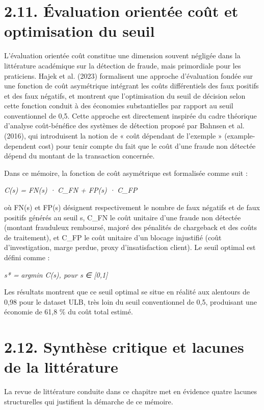 \section{2.11. Évaluation orientée coût et optimisation du seuil}

L'évaluation orientée coût constitue une dimension souvent négligée dans la littérature académique sur la détection de fraude, mais primordiale pour les praticiens. Hajek et al. (2023) formalisent une approche d'évaluation fondée sur une fonction de coût asymétrique intégrant les coûts différentiels des faux positifs et des faux négatifs, et montrent que l'optimisation du seuil de décision selon cette fonction conduit à des économies substantielles par rapport au seuil conventionnel de 0,5. Cette approche est directement inspirée du cadre théorique d'analyse coût-bénéfice des systèmes de détection proposé par Bahnsen et al. (2016), qui introduisent la notion de « coût dépendant de l'exemple » (example-dependent cost) pour tenir compte du fait que le coût d'une fraude non détectée dépend du montant de la transaction concernée.

Dans ce mémoire, la fonction de coût asymétrique est formalisée comme suit :

\emph{C(s) = FN(}\emph{s) ·}\emph{ C\_FN + FP(}\emph{s) ·}\emph{ C\_FP}

où FN(s) et FP(s) désignent respectivement le nombre de faux négatifs et de faux positifs générés au seuil s, C\_FN le coût unitaire d'une fraude non détectée (montant frauduleux remboursé, majoré des pénalités de chargeback et des coûts de traitement), et C\_FP le coût unitaire d'un blocage injustifié (coût d'investigation, marge perdue, proxy d'insatisfaction client). Le seuil optimal est défini comme :

\emph{s}\emph{* = }\emph{argmin}\emph{ C(s), pour s }\emph{∈}\emph{ [0,1]}

Les résultats montrent que ce seuil optimal se situe en réalité aux alentours de 0,98 pour le dataset ULB, très loin du seuil conventionnel de 0,5, produisant une économie de 61,8 \% du coût total estimé.

\section{2.12. Synthèse critique et lacunes de la littérature}

La revue de littérature conduite dans ce chapitre met en évidence quatre lacunes structurelles qui justifient la démarche de ce mémoire.

